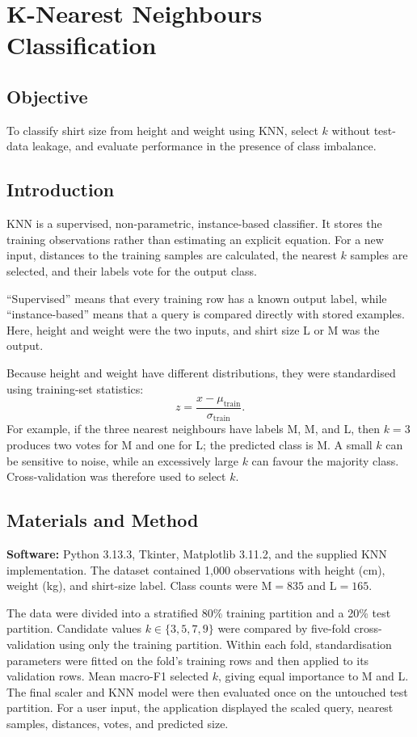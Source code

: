 \documentclass[12pt,a4paper]{report}
\newcommand{\experiment}[2]{
\chapter{#1}}
\begin{document}
\experiment{K-Nearest Neighbours Classification}{02}

\section{Objective}
To classify shirt size from height and weight using KNN, select $k$ without test-data leakage, and evaluate performance in the presence of class imbalance.

\section{Introduction}
KNN is a supervised, non-parametric, instance-based classifier. It stores the training observations rather than estimating an explicit equation. For a new input, distances to the training samples are calculated, the nearest $k$ samples are selected, and their labels vote for the output class.

``Supervised'' means that every training row has a known output label, while ``instance-based'' means that a query is compared directly with stored examples. Here, height and weight were the two inputs, and shirt size L or M was the output.

Because height and weight have different distributions, they were standardised using training-set statistics:
\begin{equation}
z=\frac{x-\mu_{\mathrm{train}}}{\sigma_{\mathrm{train}}}.
\end{equation}
For example, if the three nearest neighbours have labels M, M, and L, then $k=3$ produces two votes for M and one for L; the predicted class is M. A small $k$ can be sensitive to noise, while an excessively large $k$ can favour the majority class. Cross-validation was therefore used to select $k$.

\section{Materials and Method}
\textbf{Software:} Python 3.13.3, Tkinter, Matplotlib 3.11.2, and the supplied KNN implementation. The dataset contained 1,000 observations with height (cm), weight (kg), and shirt-size label. Class counts were M$=835$ and L$=165$.

The data were divided into a stratified 80\% training partition and a 20\% test partition. Candidate values $k\in\{3,5,7,9\}$ were compared by five-fold cross-validation using only the training partition. Within each fold, standardisation parameters were fitted on the fold's training rows and then applied to its validation rows. Mean macro-F1 selected $k$, giving equal importance to M and L. The final scaler and KNN model were then evaluated once on the untouched test partition. For a user input, the application displayed the scaled query, nearest samples, distances, votes, and predicted size.
\end{document}
